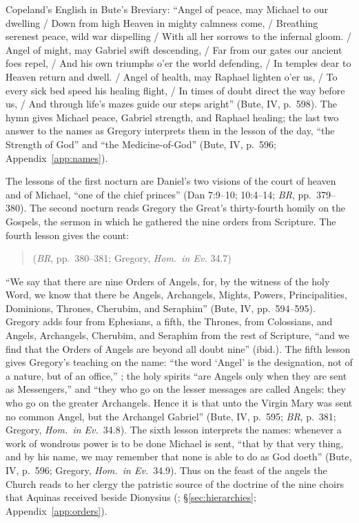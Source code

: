 Copeland's English in Bute's Breviary: ``Angel of peace, may Michael to
our dwelling / Down from high Heaven in mighty calmness come, / Breathing
serenest peace, wild war dispelling / With all her sorrows to the infernal
gloom. / Angel of might, may Gabriel swift descending, / Far from our
gates our ancient foes repel, / And his own triumphs o'er the world
defending, / In temples dear to Heaven return and dwell. / Angel of
health, may Raphael lighten o'er us, / To every sick bed speed his healing
flight, / In times of doubt direct the way before us, / And through life's
mazes guide our steps aright'' (Bute, IV, p.~598). The hymn gives Michael peace,
Gabriel strength, and Raphael healing; the last two answer to the names as
Gregory interprets them in the lesson of the day, ``the Strength of
God'' and ``the Medicine-of-God'' (Bute, IV, p.~596;
Appendix~\ref{app:names}).

The lessons of the first nocturn are Daniel's two visions of the court of
heaven and of Michael, ``one of the chief princes'' (Dan 7:9--10;
10:4--14; \emph{BR}, pp.~379--380). The second nocturn reads Gregory the
Great's thirty-fourth homily on the Gospels, the sermon in which he
gathered the nine orders from Scripture. The fourth lesson gives the
count:
\begin{quote}
(\emph{BR}, pp.~380--381; Gregory, \emph{Hom.\ in Ev.} 34.7)
\end{quote}
``We say that there are nine Orders of Angels, for, by the witness of the
holy Word, we know that there be Angels, Archangels, Mights, Powers,
Principalities, Dominions, Thrones, Cherubim, and Seraphim'' (Bute, IV,
pp.~594--595). Gregory adds four from Ephesians, a fifth, the Thrones,
from Colossians, and Angels, Archangels, Cherubim, and Seraphim from the
rest of Scripture, ``and we find that the Orders of Angels are beyond all
doubt nine'' (ibid.). The fifth lesson gives Gregory's teaching on the
name: ``the word `Angel' is the designation, not of a nature, but of an
office,'' ; the
holy spirits ``are Angels only when they are sent as Messengers,'' and
``they who go on the lesser messages are called Angels: they who go on
the greater Archangels. Hence it is that unto the Virgin Mary was sent no
common Angel, but the Archangel Gabriel'' (Bute, IV, p.~595; \emph{BR},
p.~381; Gregory, \emph{Hom.\ in Ev.}\ 34.8). The sixth lesson interprets the
names: whenever a work of wondrous power is to be done Michael is sent,
``that by that very thing, and by his name, we may remember that none is
able to do as God doeth'' (Bute, IV, p.~596; Gregory, \emph{Hom.\ in Ev.}\ 34.9).
Thus on the feast of the angels the Church reads to her clergy the
patristic source of the doctrine of the nine choirs that Aquinas received
beside Dionysius (; \S\ref{sec:hierarchies};
Appendix~\ref{app:orders}).

